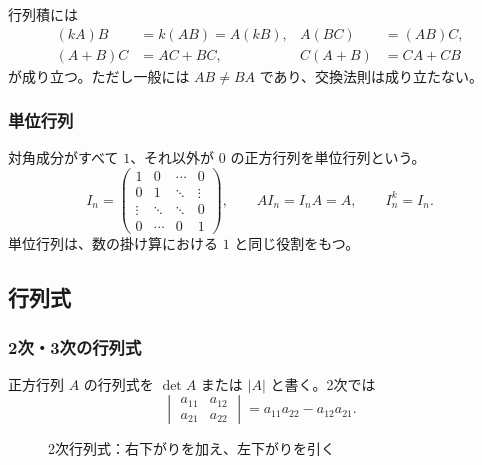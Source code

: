 行列積には
\begin{align}
 (kA)B&=k(AB)=A(kB),&
 A(BC)&=(AB)C,\\
 (A+B)C&=AC+BC,&
 C(A+B)&=CA+CB
\end{align}
が成り立つ。ただし一般には $AB\ne BA$ であり、交換法則は成り立たない。

\subsubsection{単位行列}

対角成分がすべて $1$、それ以外が $0$ の正方行列を単位行列という。
\[
 I_n=\begin{pmatrix}
 1&0&\cdots&0\\0&1&\ddots&\vdots\\
 \vdots&\ddots&\ddots&0\\0&\cdots&0&1
 \end{pmatrix},\qquad
 AI_n=I_nA=A,\qquad I_n^k=I_n.
\]
単位行列は、数の掛け算における $1$ と同じ役割をもつ。

\subsection{行列式}

\subsubsection{2次・3次の行列式}

正方行列 $A$ の行列式を $\det A$ または $|A|$ と書く。2次では
\begin{equation}
 \begin{vmatrix}a_{11}&a_{12}\\a_{21}&a_{22}\end{vmatrix}
 =a_{11}a_{22}-a_{12}a_{21}.
\end{equation}

\begin{figure}[htbp]
\centering
{}
\caption{2次行列式：右下がりを加え、左下がりを引く}
\end{figure}

